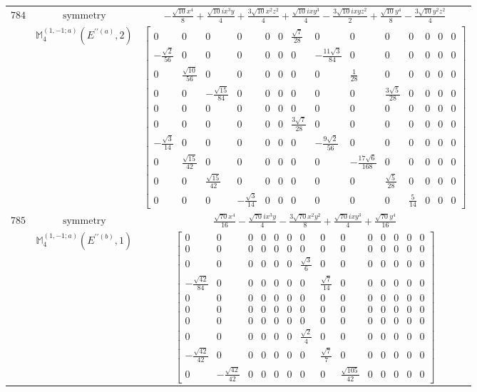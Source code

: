 \documentclass[fleqn,8pt,landscape]{jsarticle}
\begin{document}
\begin{longtable}{ccc}
$ 784 $ & $ \text{symmetry} $ & $ - \frac{\sqrt{10} x^{4}}{8} + \frac{\sqrt{10} i x^{3} y}{4} + \frac{3 \sqrt{10} x^{2} z^{2}}{4} + \frac{\sqrt{10} i x y^{3}}{4} - \frac{3 \sqrt{10} i x y z^{2}}{2} + \frac{\sqrt{10} y^{4}}{8} - \frac{3 \sqrt{10} y^{2} z^{2}}{4} $ \\
$  $ & $ \mathbb{M}_{4}^{(1,-1;a)}(E^{\prime\prime(a)},2) $ & $ \begin{bmatrix} 0 & 0 & 0 & 0 & 0 & 0 & \frac{\sqrt{7}}{28} & 0 & 0 & 0 & 0 & 0 & 0 & 0 \\ - \frac{\sqrt{2}}{56} & 0 & 0 & 0 & 0 & 0 & 0 & - \frac{11 \sqrt{3}}{84} & 0 & 0 & 0 & 0 & 0 & 0 \\ 0 & \frac{\sqrt{10}}{56} & 0 & 0 & 0 & 0 & 0 & 0 & \frac{1}{28} & 0 & 0 & 0 & 0 & 0 \\ 0 & 0 & - \frac{\sqrt{15}}{84} & 0 & 0 & 0 & 0 & 0 & 0 & \frac{3 \sqrt{5}}{28} & 0 & 0 & 0 & 0 \\ 0 & 0 & 0 & 0 & 0 & 0 & 0 & 0 & 0 & 0 & 0 & 0 & 0 & 0 \\ 0 & 0 & 0 & 0 & 0 & 0 & \frac{3 \sqrt{7}}{28} & 0 & 0 & 0 & 0 & 0 & 0 & 0 \\ - \frac{\sqrt{3}}{14} & 0 & 0 & 0 & 0 & 0 & 0 & - \frac{9 \sqrt{2}}{56} & 0 & 0 & 0 & 0 & 0 & 0 \\ 0 & \frac{\sqrt{15}}{42} & 0 & 0 & 0 & 0 & 0 & 0 & - \frac{17 \sqrt{6}}{168} & 0 & 0 & 0 & 0 & 0 \\ 0 & 0 & \frac{\sqrt{15}}{42} & 0 & 0 & 0 & 0 & 0 & 0 & \frac{\sqrt{5}}{28} & 0 & 0 & 0 & 0 \\ 0 & 0 & 0 & - \frac{\sqrt{3}}{14} & 0 & 0 & 0 & 0 & 0 & 0 & \frac{5}{14} & 0 & 0 & 0 \end{bmatrix} $ \\ \hline
$ 785 $ & $ \text{symmetry} $ & $ \frac{\sqrt{70} x^{4}}{16} - \frac{\sqrt{70} i x^{3} y}{4} - \frac{3 \sqrt{70} x^{2} y^{2}}{8} + \frac{\sqrt{70} i x y^{3}}{4} + \frac{\sqrt{70} y^{4}}{16} $ \\
$  $ & $ \mathbb{M}_{4}^{(1,-1;a)}(E^{\prime\prime(b)},1) $ & $ \begin{bmatrix} 0 & 0 & 0 & 0 & 0 & 0 & 0 & 0 & 0 & 0 & 0 & 0 & 0 & 0 \\ 0 & 0 & 0 & 0 & 0 & 0 & 0 & 0 & 0 & 0 & 0 & 0 & 0 & 0 \\ 0 & 0 & 0 & 0 & 0 & 0 & \frac{\sqrt{3}}{6} & 0 & 0 & 0 & 0 & 0 & 0 & 0 \\ - \frac{\sqrt{42}}{84} & 0 & 0 & 0 & 0 & 0 & 0 & \frac{\sqrt{7}}{14} & 0 & 0 & 0 & 0 & 0 & 0 \\ 0 & 0 & 0 & 0 & 0 & 0 & 0 & 0 & 0 & 0 & 0 & 0 & 0 & 0 \\ 0 & 0 & 0 & 0 & 0 & 0 & 0 & 0 & 0 & 0 & 0 & 0 & 0 & 0 \\ 0 & 0 & 0 & 0 & 0 & 0 & 0 & 0 & 0 & 0 & 0 & 0 & 0 & 0 \\ 0 & 0 & 0 & 0 & 0 & 0 & \frac{\sqrt{2}}{4} & 0 & 0 & 0 & 0 & 0 & 0 & 0 \\ - \frac{\sqrt{42}}{42} & 0 & 0 & 0 & 0 & 0 & 0 & \frac{\sqrt{7}}{7} & 0 & 0 & 0 & 0 & 0 & 0 \\ 0 & - \frac{\sqrt{42}}{42} & 0 & 0 & 0 & 0 & 0 & 0 & \frac{\sqrt{105}}{42} & 0 & 0 & 0 & 0 & 0 \end{bmatrix} $ \\ \hline

\end{longtable}
\end{document}
